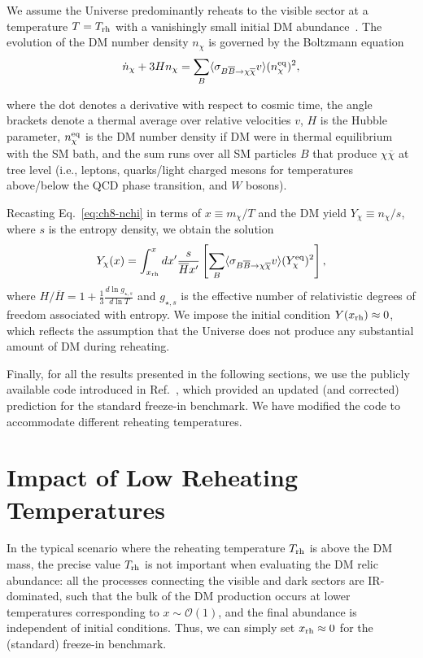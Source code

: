 We assume the Universe predominantly reheats to the visible sector at a temperature $T=T_{\rm{rh}}$ with a vanishingly small initial DM abundance~\cite{Hall:2009bx}. The evolution of the DM number density $n_\chi$ is governed by the Boltzmann equation
\begin{equation}
    \dot{n}_\chi+3H n_\chi=\sum_{B} \langle \sigma_{B\overline{B} \rightarrow \chi\overline{\chi}} v \rangle (n^{\rm eq}_\chi)^2, \label{eq:ch8-nchi}
\end{equation}

where the dot denotes a derivative with respect to cosmic time, the angle brackets denote a thermal average over relative velocities $v$, $H$ is the Hubble parameter, $n^{\rm eq}_\chi$ is the DM number density if DM were in thermal equilibrium with the SM bath, and the sum runs over all SM particles $B$ that produce $\chi \overline{\chi}$ at tree level (i.e., leptons, quarks/light charged mesons for temperatures above/below the QCD phase transition, and $W$ bosons).

Recasting Eq.~\eqref{eq:ch8-nchi} in terms of $x\equiv m_\chi/T$ and the DM yield $Y_\chi\equiv n_\chi/s$, where $s$ is the entropy density, we obtain the solution
\begin{equation}
     Y_\chi(x)=\int_{x_{\rm rh}}^x dx^\prime \frac{s}{\overline{H}x^\prime}\left[\sum_{B}\langle \sigma_{B\overline{B} \rightarrow \chi\overline{\chi}} v \rangle  (Y^{\rm eq}_\chi)^2\right], \label{eq:ch8-Ychi}
\end{equation}
where $H/\overline{H}= 1+ \frac{1}{3}\frac{d\ln g_{\star,s}}{d\ln T}$ and $g_{\star,s}$ is the effective number of relativistic degrees of freedom associated with entropy.
We impose the initial condition $Y(x_{\rm rh})\approx 0$, which reflects the assumption that the Universe does not produce any substantial amount of DM during reheating.

Finally, for all the results presented in the following sections, we use the publicly available code introduced in Ref.~\cite{Bhattiprolu:2023akk}, which provided an updated (and corrected) prediction for the standard freeze-in benchmark. We have modified the code to accommodate different reheating temperatures.

\section{Impact of Low Reheating Temperatures}
\label{sec:ch8-lowTrh}

In the typical scenario where the reheating temperature $T_{\rm{rh}}$ is above the DM mass, the precise value $T_{\rm{rh}}$ is not important when evaluating the DM relic abundance: all the processes connecting the visible and dark sectors are IR-dominated, such that the bulk of the DM production occurs at lower temperatures corresponding to $x\sim \mathcal{O}(1)$, and the final abundance is independent of initial conditions. Thus, we can simply set $x_{\rm{rh}}\approx 0$ for the (standard) freeze-in benchmark.

